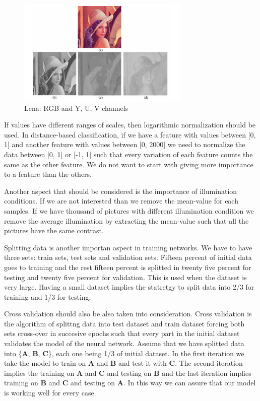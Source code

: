 \begin{figure}[h]
	\begin{center}
		\includegraphics[width=309px,height=192px]{src/img/state/lenayuv}
		\caption{Lena: RGB and Y, U, V channels\cite{lena}} \label{fig:svsq}
    \end{center}
\end{figure}

If values have different ranges of scales, then logarithmic normalization should be used. In distance-based classification, if we have a feature with values between [0, 1] and another feature with values between [0, 2000] we need to normalize the data between [0, 1] or [-1, 1] such that every variation of each feature counts the same as the other feature. We do not want to start with giving more importance to a feature than the others.

Another aspect that should be considered is the importance of illumination conditions. If we are not interested than we remove the mean-value for each samples. If we have thousand of pictures with different illumination condition we remove the average illumination by extracting the mean-value such that all the pictures have the same contrast.

Splitting data is another importan aspect in training networks. We have to have three sets: train sets, test sets and validation sets. Fifteen percent of initial data goes to training and the rest fifteen percent is splitted in twenty five percent for testing and twenty five percent for validation. This is used when the dataset is very large. Having a small dataset implies the statretgy to split data into 2/3 for training and 1/3 for testing\cite{splitting}.


Cross validation\cite{cross-validation} should also be also taken into consideration. Cross validation is the algorithm of splittng data into test dataset and train dataset forcing both sets cross-over in succesive epochs such that every part in the initial dataset validates the model of the neural network. Assume that we have splitted data into \{\textbf{A}, \textbf{B}, \textbf{C}\}, each one being 1/3 of initial dataset. In the first iteration we take the model to train on \textbf{A} and \textbf{B} and test it with \textbf{C}. The second iteration implies the training on \textbf{A} and \textbf{C} and testing on \textbf{B} and the last iteration implies training on \textbf{B} and \textbf{C} and testing on \textbf{A}. In this way we can assure that our model is working well for every case.




